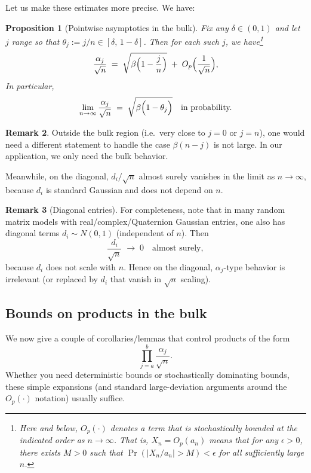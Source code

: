 \documentclass[letterpaper,11pt,oneside,reqno]{article}
\numberwithin{equation}{section}
\newtheorem{proposition}{Proposition}[section]
\theoremstyle{definition}
\newtheorem{remark}[proposition]{Remark}
\begin{document}
Let us make these estimates more precise.  We have:
\begin{proposition}[Pointwise asymptotics in the bulk]
\label{prop:alpha-bulk}
Fix any $\delta \in (0,1)$ and let $j$ range so that $\theta_j := j/n \in [\delta,\, 1-\delta]$.
Then for each such $j$, we have\footnote{Here and below, $O_p(\cdot)$ denotes a term that is stochastically bounded at the indicated order as $n\to\infty$. That is, $X_n = O_p(a_n)$ means that for any $\epsilon>0$, there exists $M>0$ such that $\Pr(|X_n/a_n| > M) < \epsilon$ for all sufficiently large $n$.}
\[
  \frac{\alpha_j}{\sqrt{n}}
  \;=\; \sqrt{\beta\Bigl(1 - \frac{j}{n}\Bigr)}
  \;+\; O_p\Bigl(\frac{1}{\sqrt{n}}\Bigr),
\]
In particular,
\[
  \lim_{n\to\infty} \frac{\alpha_j}{\sqrt{n}}
  \;=\; \sqrt{\beta\Bigl(1-\theta_j\Bigr)}
  \quad\text{in probability.}
\]
\end{proposition}


\begin{remark}
Outside the bulk region (i.e.\ very close to $j=0$ or $j=n$), one would need a different statement to handle the case $\beta(n-j)$ is not large. 
In our application, we only need the bulk behavior.
\end{remark}

Meanwhile, on the diagonal, $d_i/\sqrt{n}$ 
almost surely vanishes in the limit as $n\to\infty$,
because $d_i$ is standard Gaussian and does not depend on $n$.


\begin{remark}[Diagonal entries]
For completeness, note that in many random matrix models with real/complex/Quaternion Gaussian entries, one also has diagonal terms $d_i \sim N(0,1)$ (independent of $n$).  Then
\[
  \frac{d_i}{\sqrt{n}} \;\to\; 0
  \quad\text{almost surely},
\]
because $d_i$ does not scale with $n$.  Hence on the diagonal, $\alpha_j$-type behavior is irrelevant (or replaced by $d_i$ that vanish in $\sqrt{n}$ scaling).
\end{remark}

\subsection{Bounds on products in the bulk}

We now give a couple of corollaries/lemmas that control products of the form
\[
  \prod_{j=a}^{b} \frac{\alpha_j}{\sqrt{n}}.
\]
Whether you need deterministic bounds or stochastically dominating bounds, these simple expansions
(and standard large-deviation arguments around the $O_p(\cdot)$ notation) usually suffice.
\end{document}
